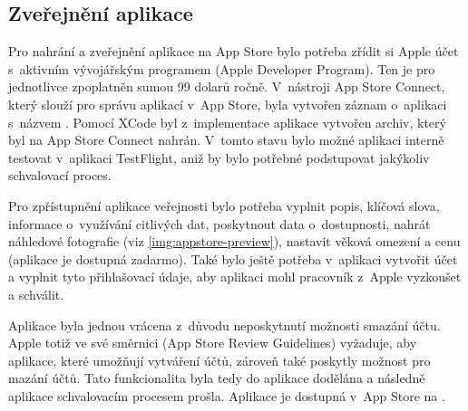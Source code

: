 \documentclass[thesis=M,czech]{FITthesis}[2019/12/23]
\begin{document}
\subsection{Zveřejnění aplikace}
Pro nahrání a zveřejnění aplikace na App Store bylo potřeba zřídit si Apple účet s~aktivním vývojářským programem (Apple Developer Program). Ten je pro jednotlivce zpoplatněn sumou 99 dolarů ročně. V~nástroji App Store Connect, který slouží pro správu aplikací v~App Store, byla vytvořen záznam o~aplikaci s~názvem . Pomocí XCode byl z~implementace aplikace vytvořen archiv, který byl na App Store Connect nahrán. V~tomto stavu bylo možné aplikaci interně testovat v~aplikaci TestFlight, aniž by bylo potřebné podstupovat jakýkoliv schvalovací proces.

Pro zpřístupnění aplikace veřejnosti bylo potřeba vyplnit popis, klíčová slova, informace o~využívání citlivých dat, poskytnout data o~dostupnosti, nahrát náhledové fotografie (viz \ref{img:appstore-preview}), nastavit věková omezení a cenu (aplikace je dostupná zadarmo). Také bylo ještě potřeba v~aplikaci vytvořit účet a vyplnit tyto přihlašovací údaje, aby aplikaci mohl pracovník z~Apple vyzkoušet a schválit.

Aplikace byla jednou vrácena z~důvodu neposkytnutí možnosti smazání účtu. Apple totiž ve své směrnici (App Store Review Guidelines) vyžaduje, aby aplikace, které umožňují vytváření účtů, zároveň také poskytly možnost pro mazání účtů. Tato funkcionalita byla tedy do aplikace dodělána a následně aplikace schvalovacím procesem prošla. Aplikace je dostupná v~App Store na \cite{sprinkled-appstore}.
\end{document}
